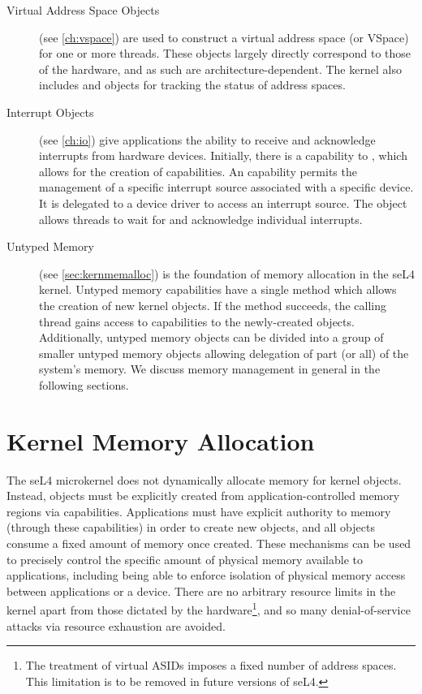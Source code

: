 \begin{description}
    \item[Virtual Address Space Objects] (see \autoref{ch:vspace})
    are used to construct a virtual
    address space (or VSpace) for one or more threads. These
    objects largely directly correspond to those of the hardware, and
    as such are architecture-dependent. The kernel also includes  and  objects for tracking the status of
    address spaces.

    \item[Interrupt Objects] (see \autoref{ch:io}) give applications the ability to receive
    and acknowledge interrupts from hardware devices.
    Initially, there is a capability to ,
    which allows for the creation of  capabilities.
    An  capability permits the management of a specific
    interrupt source associated with a specific device.
    It is delegated to
    a device driver to access an interrupt source. The 
    object allows threads to wait for and acknowledge individual
    interrupts.

    \item[Untyped Memory] (see \autoref{sec:kernmemalloc}) is the foundation of memory allocation
    in the seL4 kernel.  Untyped memory capabilities have a single method
    which allows the creation of new kernel objects. If the method
    succeeds, the calling thread gains access to capabilities to the
    newly-created objects. Additionally, untyped memory objects can be
    divided into a group of smaller untyped memory objects allowing
    delegation of part (or all) of the system's memory.  We discuss
    memory management in general in the following sections.

\end{description}

\section{Kernel Memory Allocation}
\label{sec:kernmemalloc}

The seL4 microkernel does not dynamically allocate memory for kernel objects.
Instead, objects must be explicitly created from application-controlled memory
regions via  capabilities.  Applications must have
explicit authority to memory (through these  capabilities) in
order to create new objects, and all objects consume a fixed amount of memory once
created. These mechanisms can be used to precisely control
the specific amount of physical memory available to applications,
including being able to enforce isolation of physical memory access
between applications or a device.  There are no arbitrary resource
limits in the kernel apart from those dictated by the
hardware\footnote{The treatment of virtual ASIDs imposes a fixed number
of address spaces. This limitation is to be removed in future
versions of seL4.}, and so many denial-of-service attacks via resource
exhaustion are avoided.


